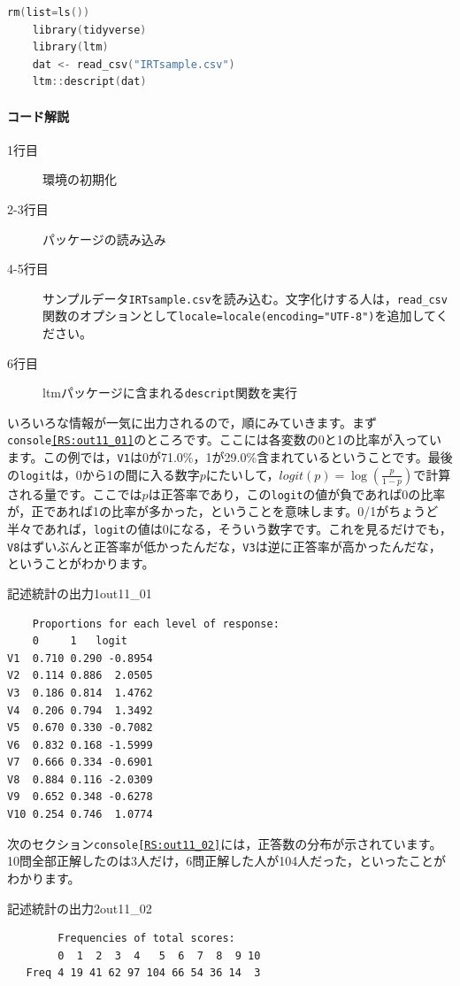 \documentclass{ltjsbook}
\begin{document}
\begin{lstlisting}[language=c++,label={code::11_01},caption={データの読み込みから記述統計量の計算まで}]
    rm(list=ls())
    library(tidyverse)
    library(ltm)
    dat <- read_csv("IRTsample.csv")
    ltm::descript(dat)
\end{lstlisting}
    
\paragraph{コード解説}
    \begin{description}
        \item[1行目] 環境の初期化
        \item[2-3行目] パッケージの読み込み
        \item[4-5行目] サンプルデータ\texttt{IRTsample.csv}を読み込む。文字化けする人は，\verb|read_csv|関数のオプションとして\texttt{locale=locale(encoding="UTF-8")}を追加してください。
        \item[6行目] ltmパッケージに含まれる\texttt{descript}関数を実行
    \end{description}

いろいろな情報が一気に出力されるので，順にみていきます。まず\texttt{console\ref{RS:out11_01}}のところです。ここには各変数の0と1の比率が入っています。この例では，\texttt{V1}は0が71.0\%，1が29.0\%含まれているということです。最後の\texttt{logit}は，0から1の間に入る数字$p$にたいして，$logit(p)=\log\left(\frac{p}{1-p}\right)$で計算される量です。ここでは$p$は正答率であり，この\texttt{logit}の値が負であれば0の比率が，正であれば1の比率が多かった，ということを意味します。0/1がちょうど半々であれば，\texttt{logit}の値は0になる，そういう数字です。これを見るだけでも，\texttt{V8}はずいぶんと正答率が低かったんだな，\texttt{V3}は逆に正答率が高かったんだな，ということがわかります。
\begin{Rscreen}{記述統計の出力1}{out11_01}
\begin{verbatim}
    Proportions for each level of response:
    0     1   logit
V1  0.710 0.290 -0.8954
V2  0.114 0.886  2.0505
V3  0.186 0.814  1.4762
V4  0.206 0.794  1.3492
V5  0.670 0.330 -0.7082
V6  0.832 0.168 -1.5999
V7  0.666 0.334 -0.6901
V8  0.884 0.116 -2.0309
V9  0.652 0.348 -0.6278
V10 0.254 0.746  1.0774
\end{verbatim}
\end{Rscreen}

次のセクション\texttt{console\ref{RS:out11_02}}には，正答数の分布が示されています。10問全部正解したのは3人だけ，6問正解した人が104人だった，といったことがわかります。
\begin{Rscreen}{記述統計の出力2}{out11_02}
    \begin{verbatim}
        Frequencies of total scores:
        0  1  2  3  4   5  6  7  8  9 10
   Freq 4 19 41 62 97 104 66 54 36 14  3
    \end{verbatim}
    \end{Rscreen}
    
\end{document}
